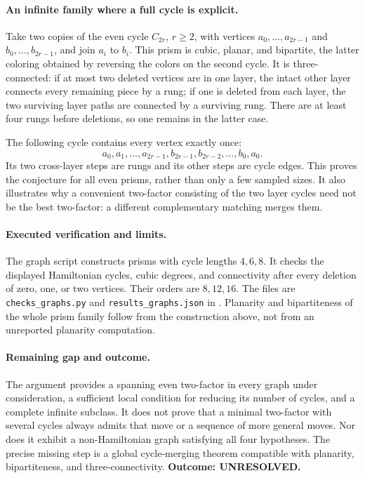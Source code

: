 \documentclass[11pt,a4paper]{article}
\begin{document}
\paragraph{An infinite family where a full cycle is explicit.}
Take two copies of the even cycle $C_{2r}$, $r\ge2$, with vertices
$a_0,\ldots,a_{2r-1}$ and $b_0,\ldots,b_{2r-1}$, and join $a_i$
to $b_i$. This prism is cubic, planar, and bipartite, the latter
coloring obtained by reversing the colors on the second cycle. It is
three-connected: if at most two deleted vertices are in one layer,
the intact other layer connects every remaining piece by a rung; if
one is deleted from each layer, the two surviving layer paths are
connected by a surviving rung. There are at least four rungs before
deletions, so one remains in the latter case.

The following cycle contains every vertex exactly once:
\[
 a_0,a_1,\ldots,a_{2r-1},b_{2r-1},b_{2r-2},\ldots,b_0,a_0.
\]
Its two cross-layer steps are rungs and its other steps are cycle
edges. This proves the conjecture for all even prisms, rather than
only a few sampled sizes. It also illustrates why a convenient
two-factor consisting of the two layer cycles need not be the best
two-factor: a different complementary matching merges them.

\paragraph{Executed verification and limits.}
The graph script constructs prisms with cycle lengths $4,6,8$. It
checks the displayed Hamiltonian cycles, cubic degrees, and connectivity
after every deletion of zero, one, or two vertices. Their orders are
$8,12,16$. The files are \texttt{checks\_graphs.py} and
\texttt{results\_graphs.json} in
.
Planarity and bipartiteness of the whole prism family follow from the
construction above, not from an unreported planarity computation.

\paragraph{Remaining gap and outcome.}
The argument provides a spanning even two-factor in every graph under
consideration, a sufficient local condition for reducing its number of
cycles, and a complete infinite subclass. It does not prove that a
minimal two-factor with several cycles always admits that move or a
sequence of more general moves. Nor does it exhibit a non-Hamiltonian
graph satisfying all four hypotheses. The precise missing step is a
global cycle-merging theorem compatible with planarity, bipartiteness,
and three-connectivity. \textbf{Outcome: UNRESOLVED.}
\end{document}
